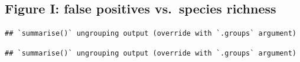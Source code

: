 \documentclass[
]{article}
\newenvironment{Shaded}{\begin{snugshade}}{\end{snugshade}}
\newcommand{\CommentTok}[1]{\textcolor[rgb]{0.56,0.35,0.01}{\textit{#1}}}
\newcommand{\DataTypeTok}[1]{\textcolor[rgb]{0.13,0.29,0.53}{#1}}
\newcommand{\KeywordTok}[1]{\textcolor[rgb]{0.13,0.29,0.53}{\textbf{#1}}}
\newcommand{\NormalTok}[1]{#1}
\newcommand{\OperatorTok}[1]{\textcolor[rgb]{0.81,0.36,0.00}{\textbf{#1}}}
\newcommand{\StringTok}[1]{\textcolor[rgb]{0.31,0.60,0.02}{#1}}
\begin{document}
\hypertarget{figure-i-false-positives-vs.-species-richness}{%
\subsection{Figure I: false positives vs.~species
richness}\label{figure-i-false-positives-vs.-species-richness}}

\begin{Shaded}
\end{Shaded}

\begin{verbatim}
## `summarise()` ungrouping output (override with `.groups` argument)
\end{verbatim}

\begin{Shaded}
\end{Shaded}

\begin{verbatim}
## `summarise()` ungrouping output (override with `.groups` argument)
\end{verbatim}
\end{document}
